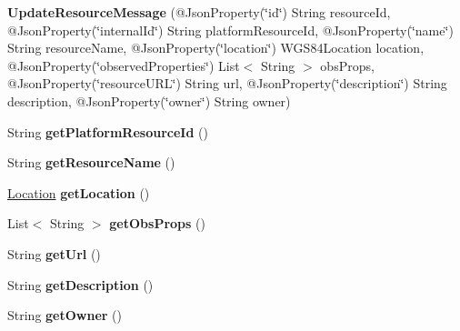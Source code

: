 \begin{DoxyCompactItemize}
\item 
\mbox{\label{classeu_1_1h2020_1_1symbiote_1_1messages_1_1UpdateResourceMessage_a6b10ee15a2c19958b11ae5e803945ee7}} 
{\bfseries Update\+Resource\+Message} (@Json\+Property(\char`\"{}id\char`\"{}) String resource\+Id, @Json\+Property(\char`\"{}internal\+Id\char`\"{}) String platform\+Resource\+Id, @Json\+Property(\char`\"{}name\char`\"{}) String resource\+Name, @Json\+Property(\char`\"{}location\char`\"{}) W\+G\+S84\+Location location, @Json\+Property(\char`\"{}observed\+Properties\char`\"{}) List$<$ String $>$ obs\+Props, @Json\+Property(\char`\"{}resource\+U\+RL\char`\"{}) String url, @Json\+Property(\char`\"{}description\char`\"{}) String description, @Json\+Property(\char`\"{}owner\char`\"{}) String owner)
\item 
\mbox{\label{classeu_1_1h2020_1_1symbiote_1_1messages_1_1UpdateResourceMessage_a22f62d1a209e3cc48a428b6da285afb2}} 
String {\bfseries get\+Platform\+Resource\+Id} ()
\item 
\mbox{\label{classeu_1_1h2020_1_1symbiote_1_1messages_1_1UpdateResourceMessage_aa4d6f18d67ad380ac571ce0e77673f4a}} 
String {\bfseries get\+Resource\+Name} ()
\item 
\mbox{\label{classeu_1_1h2020_1_1symbiote_1_1messages_1_1UpdateResourceMessage_ad980b5a0d5b00457febf8120399795f5}} 
\hyperlink{classeu_1_1h2020_1_1symbiote_1_1model_1_1data_1_1Location}{Location} {\bfseries get\+Location} ()
\item 
\mbox{\label{classeu_1_1h2020_1_1symbiote_1_1messages_1_1UpdateResourceMessage_a97a896e9ddb37f6d637b799a9d69050d}} 
List$<$ String $>$ {\bfseries get\+Obs\+Props} ()
\item 
\mbox{\label{classeu_1_1h2020_1_1symbiote_1_1messages_1_1UpdateResourceMessage_a53a0bc7567a5098528134cabbd8395ff}} 
String {\bfseries get\+Url} ()
\item 
\mbox{\label{classeu_1_1h2020_1_1symbiote_1_1messages_1_1UpdateResourceMessage_ac33f997d7a110fba85495409058b4846}} 
String {\bfseries get\+Description} ()
\item 
\mbox{\label{classeu_1_1h2020_1_1symbiote_1_1messages_1_1UpdateResourceMessage_a150a84627e13f0d0e310d16ba95a95c8}} 
String {\bfseries get\+Owner} ()
\end{DoxyCompactItemize}


